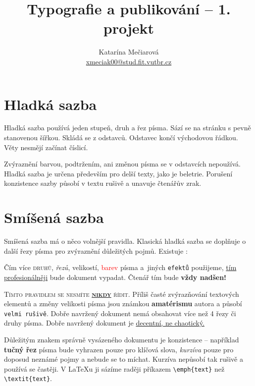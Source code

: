 \documentclass[a4paper, 10pt, twocolumn]{article}[25.2.2024]
\title{Typografie a publikování -- 1. projekt}
\author{Katarína Mečiarová\\ \href{mailto: xmeciak00@stud.fit.vutbr.cz}{xmeciak00@stud.fit.vutbr.cz}}
\date{ }
\begin{document}
    \maketitle


    \section{Hladká sazba}
        Hladká sazba používá jeden stupeň, druh a řez písma.
        Sází se na stránku s pevně stanovenou šířkou.
        Skládá se z odstavců. Odstavec končí východovou řádkou.
        Věty nesmějí začínat číslicí.

        Zvýraznění barvou, podtržením, ani změnou písma se v odstavcích nepoužívá.
        Hladká sazba je určena především pro delší texty, jako je beletrie.
        Porušení konzistence sazby působí v textu rušivě a unavuje čtenářův zrak.

    \section{Smíšená sazba}
        Smíšená sazba má o něco volnější pravidla.
        Klasická hladká sazba se doplňuje o další řezy písma pro zvýraznění důležitých pojmů.
        Existuje :

        \medskip
        \begin{adjustwidth}{0.75cm}{0.75cm}
        \hspace{0.3cm}
        Čím více \textsc{druhů}, \emph{řezů}, {\scriptsize velikostí}, \textcolor{red}{barev} písma a~jiných \texttt{efektů} použijeme, \underline{tím profesionálněji}
        bude {\selectfont dokument} vypadat. Čtenář tím bude {\Large \bfseries vždy nadšen!}
        \end{adjustwidth}
        \medskip

        \textsc{Tímto pravidlem se nesmíte \underline{\textbf{nikdy}} řídit.}
        Příliš časté zvýrazňování textových elementů a změny {\tiny velikosti} písma jsou známkou \textbf{amatérismu} autora a působí \texttt{velmi rušivě}.
        Dobře navržený dokument nemá obsahovat více než 4 řezy či druhy písma.
        Dobře navržený dokument je \underline{decentní, ne chaotický.}

        Důležitým znakem správně vysázeného dokumentu je konzistence -- například \textbf{tučný řez} písma bude vyhrazen pouze pro klíčová slova, \textit{kurzíva} pouze pro doposud neznámé pojmy a nebude se to míchat.
        Kurzíva nepůsobí tak rušivě a používá se častěji.
        V \LaTeX u ji sázíme raději příkazem \verb|\emph{text}| než \verb|\textit{text}|.
\end{document}
